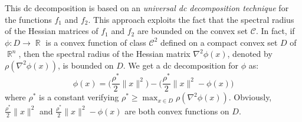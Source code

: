 \documentclass[3p]{elsarticle}
\DeclareMathOperator{\R}{\mathbb{R}}
\begin{document}
This dc decomposition is based on an \emph{universal dc decomposition technique} for the functions $f_1$ and $f_2$. This approach exploits the fact that the spectral radius of the Hessian matrices of $f_1$ and $f_2$ are bounded on the convex set $\mathcal{C}$. In fact, if $\phi: D\to \R$ is a convex function of class $\mathcal{C}^2$ defined on a compact convex set $D$ of $\R^n$, then the spectral radius of the Hessian matrix $\nabla^2 \phi(x)$, denoted by $\rho(\nabla^2 \phi(x))$, is bounded on $D$. We get a dc decomposition for $\phi$ as:
\begin{equation}\label{eq:udcd}
\phi(x) = \biggl(\frac{\rho^*}{2}\|x\|^2\biggr) - \biggl(\frac{\rho^*}{2}\|x\|^2 - \phi(x)\biggr)
\end{equation}  
where $\rho^*$ is a constant verifying $\rho^* \geq \displaystyle\max_{x\in D}\rho(\nabla^2 \phi(x))$. Obviously, $\frac{\rho^*}{2}\|x\|^2$ and $\frac{\rho^*}{2}\|x\|^2 - \phi(x)$ are both convex functions on $D$.
\end{document}

